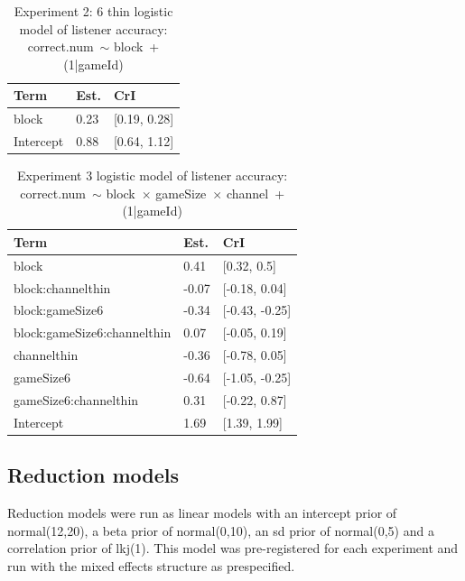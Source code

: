 \documentclass[
  english,
  a4paper,
]{article}
\begin{document}
\begin{table}[h!]

\caption{\label{tab:unnamed-chunk-10}Experiment 2: 6 thin logistic model of listener accuracy:\\ correct.num~$\sim$ block~+ (1|gameId)}
\centering
\begin{tabular}[t]{lll}
\toprule
Term & Est. & CrI\\
\midrule
block & 0.23 & {}[0.19, 0.28]\\
Intercept & 0.88 & {}[0.64, 1.12]\\
\bottomrule
\end{tabular}
\end{table}

\begin{table}[h!]

\caption{\label{tab:unnamed-chunk-10}Experiment 3 logistic model of listener accuracy:\\ correct.num~$\sim$ block~$\times$ gameSize~$\times$ channel~+ (1|gameId)}
\centering
\begin{tabular}[t]{lll}
\toprule
Term & Est. & CrI\\
\midrule
block & 0.41 & {}[0.32, 0.5]\\
block:channelthin & -0.07 & {}[-0.18, 0.04]\\
block:gameSize6 & -0.34 & {}[-0.43, -0.25]\\
block:gameSize6:channelthin & 0.07 & {}[-0.05, 0.19]\\
channelthin & -0.36 & {}[-0.78, 0.05]\\
\addlinespace
gameSize6 & -0.64 & {}[-1.05, -0.25]\\
gameSize6:channelthin & 0.31 & {}[-0.22, 0.87]\\
Intercept & 1.69 & {}[1.39, 1.99]\\
\bottomrule
\end{tabular}
\end{table}

\pagebreak

\hypertarget{reduction-models}{%
\subsection{Reduction models}\label{reduction-models}}

Reduction models were run as linear models with an intercept prior of normal(12,20), a beta prior of normal(0,10), an sd prior of normal(0,5) and a correlation prior of lkj(1). This model was pre-registered for each experiment and run with the mixed effects structure as prespecified.
\end{document}
